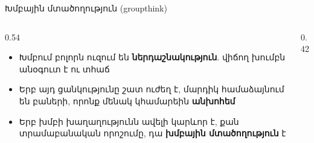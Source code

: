 \begin{frame}{Խմբային մտածողություն (groupthink)}
  \begin{columns}[c]
    \begin{column}{0.54\textwidth}
      \begin{itemize}
        \item Խմբում բոլորն ուզում են \textbf{ներդաշնակություն}. վիճող խումբն անօգուտ է ու տհաճ
        \item<2-> Երբ այդ ցանկությունը շատ ուժեղ է, մարդիկ համաձայնում են բաների, որոնք մենակ կհամարեին \textbf{անխոհեմ}
        \item<3-> Երբ խմբի խաղաղությունն ավելի կարևոր է, քան տրամաբանական որոշումը, դա \textbf{խմբային մտածողություն} է
      \end{itemize}
    \end{column}
    \begin{column}{0.42\textwidth}
      \centering
    \end{column}
  \end{columns}
\end{frame}

